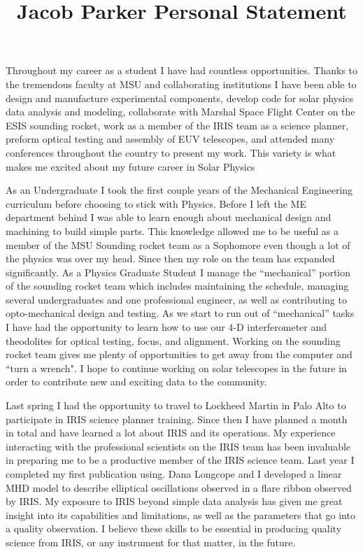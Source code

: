 \documentclass[10pt,letterpaper]{article}
\begin{document}
	\title{Jacob Parker Personal Statement}
	\date{}
	\maketitle
	
	Throughout my career as a student I have had countless opportunities. Thanks to the tremendous faculty at MSU and collaborating institutions I have been able to design and manufacture experimental components, develop code for solar physics data analysis and modeling, collaborate with Marshal Space Flight Center on the ESIS sounding rocket, work as a member of the IRIS team as a science planner, preform optical testing and assembly of EUV telescopes, and attended many conferences throughout the country to present my work.  This variety is what makes me excited about my future career in Solar Physics
	
	As an Undergraduate I took the first couple years of the Mechanical Engineering curriculum before choosing to stick with Physics.  Before I left the ME department behind I was able to learn enough about mechanical design and machining to build simple parts.  This knowledge allowed me to be useful as a member of the MSU Sounding rocket team as a Sophomore even though a lot of the physics was over my head.  Since then my role on the team has expanded significantly.  As a Physics Graduate Student I manage the ``mechanical'' portion of the sounding rocket team which includes maintaining the schedule, managing several undergraduates and one professional engineer, as well as contributing to opto-mechanical design and testing.  As we start to run out of ``mechanical'' tasks I have had the opportunity to learn how to use our 4-D interferometer and theodolites for optical testing, focus, and alignment.  Working on the sounding rocket team gives me plenty of opportunities to get away from the computer and ``turn a wrench". I hope to continue working on solar telescopes in the future in order to contribute new and exciting data to the community.
	
	Last spring I had the opportunity to travel to Lockheed Martin in Palo Alto to participate in IRIS science planner training.  Since then I have planned a month in total and have learned a lot about IRIS and its operations.  My experience interacting with the professional scientists on the IRIS team has been invaluable in preparing me to be a productive member of the IRIS science team.  Last year I completed my first publication using.  Dana Longcope and I developed a linear MHD model to describe elliptical oscillations observed in a flare ribbon observed by IRIS.  My exposure to IRIS beyond simple data analysis has given me great insight into its capabilities and limitations, as well as the parameters that go into a quality observation.  I believe these skills to be essential in producing quality science from IRIS, or any instrument for that matter, in the future.
	
\end{document}
